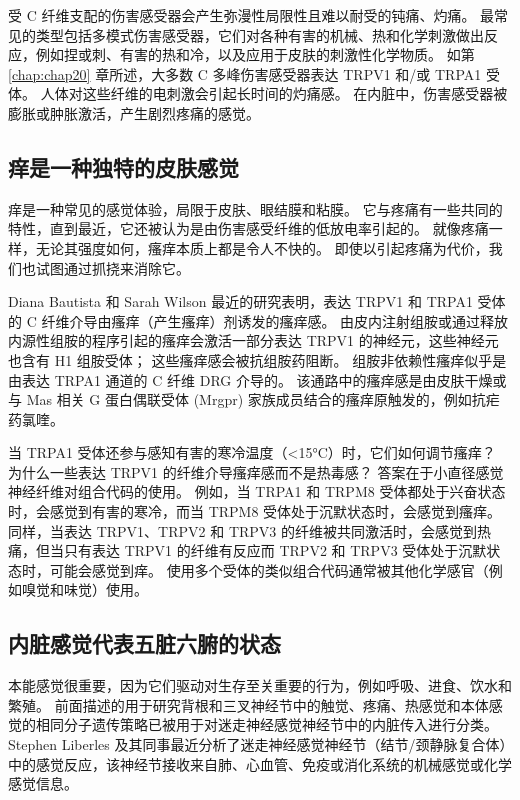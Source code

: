 受 C 纤维支配的伤害感受器会产生弥漫性局限性且难以耐受的钝痛、灼痛。 
最常见的类型包括多模式伤害感受器，它们对各种有害的机械、热和化学刺激做出反应，例如捏或刺、有害的热和冷，以及应用于皮肤的刺激性化学物质。 
如第 \ref{chap:chap20} 章所述，大多数 C 多峰伤害感受器表达 TRPV1 和/或 TRPA1 受体。 
人体对这些纤维的电刺激会引起长时间的灼痛感。 
在内脏中，伤害感受器被膨胀或肿胀激活，产生剧烈疼痛的感觉。


\subsection{痒是一种独特的皮肤感觉}
痒是一种常见的感觉体验，局限于皮肤、眼结膜和粘膜。 
它与疼痛有一些共同的特性，直到最近，它还被认为是由伤害感受纤维的低放电率引起的。 
就像疼痛一样，无论其强度如何，瘙痒本质上都是令人不快的。 
即使以引起疼痛为代价，我们也试图通过抓挠来消除它。


Diana Bautista 和 Sarah Wilson 最近的研究表明，表达 TRPV1 和 TRPA1 受体的 C 纤维介导由瘙痒（产生瘙痒）剂诱发的瘙痒感。 
由皮内注射组胺或通过释放内源性组胺的程序引起的瘙痒会激活一部分表达 TRPV1 的神经元，这些神经元也含有 H1 组胺受体； 
这些瘙痒感会被抗组胺药阻断。 
组胺非依赖性瘙痒似乎是由表达 TRPA1 通道的 C 纤维 DRG 介导的。 
该通路中的瘙痒感是由皮肤干燥或与 Mas 相关 G 蛋白偶联受体 (Mrgpr) 家族成员结合的瘙痒原触发的，例如抗疟药氯喹。


当 TRPA1 受体还参与感知有害的寒冷温度（<15°C）时，它们如何调节瘙痒？ 
为什么一些表达 TRPV1 的纤维介导瘙痒感而不是热毒感？ 
答案在于小直径感觉神经纤维对组合代码的使用。 
例如，当 TRPA1 和 TRPM8 受体都处于兴奋状态时，会感觉到有害的寒冷，而当 TRPM8 受体处于沉默状态时，会感觉到瘙痒。 
同样，当表达 TRPV1、TRPV2 和 TRPV3 的纤维被共同激活时，会感觉到热痛，但当只有表达 TRPV1 的纤维有反应而 TRPV2 和 TRPV3 受体处于沉默状态时，可能会感觉到痒。 
使用多个受体的类似组合代码通常被其他化学感官（例如嗅觉和味觉）使用。


\subsection{内脏感觉代表五脏六腑的状态}

本能感觉很重要，因为它们驱动对生存至关重要的行为，例如呼吸、进食、饮水和繁殖。 
前面描述的用于研究背根和三叉神经节中的触觉、疼痛、热感觉和本体感觉的相同分子遗传策略已被用于对迷走神经感觉神经节中的内脏传入进行分类。 
Stephen Liberles 及其同事最近分析了迷走神经感觉神经节（结节/颈静脉复合体）中的感觉反应，该神经节接收来自肺、心血管、免疫或消化系统的机械感觉或化学感觉信息。


